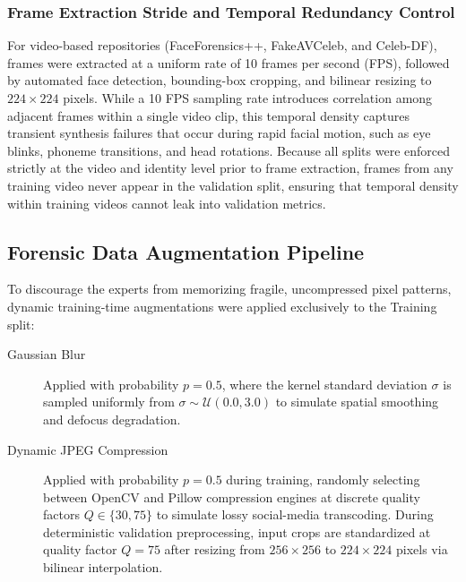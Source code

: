 \documentclass[fleqn,10pt]{wlscirep}
\begin{document}
\subsubsection*{Frame Extraction Stride and Temporal Redundancy Control}
For video-based repositories (FaceForensics++, FakeAVCeleb, and Celeb-DF), frames were extracted at a uniform rate of 10 frames per second (FPS), followed by automated face detection, bounding-box cropping, and bilinear resizing to $224 \times 224$ pixels. While a 10 FPS sampling rate introduces correlation among adjacent frames within a single video clip, this temporal density captures transient synthesis failures that occur during rapid facial motion, such as eye blinks, phoneme transitions, and head rotations. Because all splits were enforced strictly at the video and identity level prior to frame extraction, frames from any training video never appear in the validation split, ensuring that temporal density within training videos cannot leak into validation metrics.

\subsection*{Forensic Data Augmentation Pipeline}
To discourage the experts from memorizing fragile, uncompressed pixel patterns, dynamic training-time augmentations were applied exclusively to the Training split:
\begin{description}
\item[Gaussian Blur] Applied with probability $p = 0.5$, where the kernel standard deviation $\sigma$ is sampled uniformly from $\sigma \sim \mathcal{U}(0.0, 3.0)$ to simulate spatial smoothing and defocus degradation.
\item[Dynamic JPEG Compression] Applied with probability $p = 0.5$ during training, randomly selecting between OpenCV and Pillow compression engines at discrete quality factors $Q \in \{30, 75\}$ to simulate lossy social-media transcoding. During deterministic validation preprocessing, input crops are standardized at quality factor $Q = 75$ after resizing from $256 \times 256$ to $224 \times 224$ pixels via bilinear interpolation.
\end{description}
\end{document}
